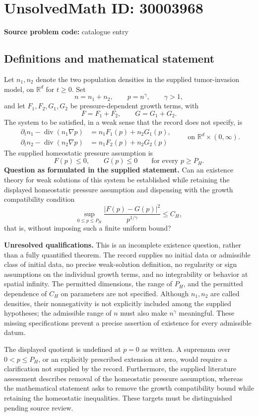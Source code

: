 \documentclass[11pt]{article}
\newcommand{\R}{\mathbb{R}}
\begin{document}
\section*{UnsolvedMath ID: 30003968}
\textbf{Source problem code:} catalogue entry
\subsection{Definitions and mathematical statement}
Let \(n_1,n_2\) denote the two population densities in the supplied tumor-invasion model, on \(\R^d\) for \(t\geq0\). Set
\[
n=n_1+n_2,\qquad p=n^\gamma,\qquad \gamma>1,
\]
and let \(F_1,F_2,G_1,G_2\) be pressure-dependent growth terms, with
\[
F=F_1+F_2,\qquad G=G_1+G_2.
\]
The system to be satisfied, in a weak sense that the record does not specify, is
\[
\begin{aligned}
\partial_t n_1-\operatorname{div}(n_1\nabla p)
 &=n_1F_1(p)+n_2G_1(p),\\
\partial_t n_2-\operatorname{div}(n_2\nabla p)
 &=n_1F_2(p)+n_2G_2(p)
\end{aligned}
\qquad\text{on }\R^d\times(0,\infty).
\]
The supplied homeostatic pressure assumption is
\[
F(p)\leq0,\qquad G(p)\leq0\qquad\text{for every }p\geq P_H.
\]
\textbf{Question as formulated in the supplied statement.} Can an existence theory for weak solutions of this system be established while retaining the displayed homeostatic pressure assumption and dispensing with the growth compatibility condition
\[
\sup_{0\leq p\leq P_H}
\frac{|F(p)-G(p)|^2}{p^{1/\gamma}}\leq C_H,
\]
that is, without imposing such a finite uniform bound?

\textbf{Unresolved qualifications.} This is an incomplete existence question, rather than a fully quantified theorem. The record supplies no initial data or admissible class of initial data, no precise weak-solution definition, no regularity or sign assumptions on the individual growth terms, and no integrability or behavior at spatial infinity. The permitted dimensions, the range of \(P_H\), and the permitted dependence of \(C_H\) on parameters are not specified. Although \(n_1,n_2\) are called densities, their nonnegativity is not explicitly included among the supplied hypotheses; the admissible range of \(n\) must also make \(n^\gamma\) meaningful. These missing specifications prevent a precise assertion of existence for every admissible datum.

The displayed quotient is undefined at \(p=0\) as written. A supremum over \(0<p\leq P_H\), or an explicitly prescribed extension at zero, would require a clarification not supplied by the record. Furthermore, the supplied literature assessment describes removal of the homeostatic pressure assumption, whereas the mathematical statement asks to remove the growth compatibility bound while retaining the homeostatic inequalities. These targets must be distinguished pending source review.
\end{document}
